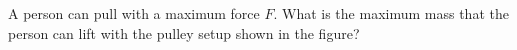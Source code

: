 A person can pull with a maximum force $F$. What is the
maximum mass that the person can lift with the pulley setup shown
in the figure?\answercheck
